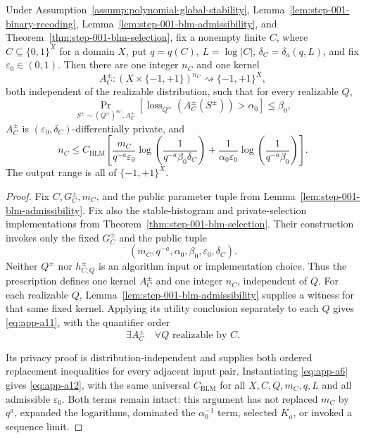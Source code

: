 \begin{proposition}
\label{prop:step-001-uniform-blm}
Under Assumption~\ref{assump:polynomial-global-stability},
Lemma~\ref{lem:step-001-binary-recoding},
Lemma~\ref{lem:step-001-blm-admissibility}, and
Theorem~\ref{thm:step-001-blm-selection}, fix a nonempty finite \(C\),
where \(C\subseteq\{0,1\}^X\) for a domain \(X\), put
\(q=q(C)\), \(L=\log|C|\),
\(\delta_C=\delta_a(q,L)\), and fix
\(\varepsilon_0\in(0,1)\).  Then there are one integer \(n_C\) and one
kernel
\[
A_C^\pm:(X\times\{-1,+1\})^{n_C}
\rightsquigarrow\{-1,+1\}^X,
\]
both independent of the realizable distribution, such that for every
realizable \(Q\),
\begin{equation}
\Pr_{S^\pm\sim(Q^\pm)^{n_C},A_C^\pm}
\!\left[
\operatorname{loss}_{Q^\pm}(A_C^\pm(S^\pm))>\alpha_0
\right]\leq\beta_0,
\label{eq:app-a11}
\end{equation}
\(A_C^\pm\) is \((\varepsilon_0,\delta_C)\)-differentially private,
and
\begin{equation}
n_C\leq C_{\mathrm{BLM}}
\left[
\frac{m_C}{q^{-a}\varepsilon_0}
\log\!\left(\frac1{q^{-a}\beta_0\delta_C}\right)
+
\frac1{\alpha_0\varepsilon_0}
\log\!\left(\frac1{q^{-a}\beta_0}\right)
\right].
\label{eq:app-a12}
\end{equation}
The output range is all of \(\{-1,+1\}^X\).
\end{proposition}

\begin{proof}
Fix \(C,G_C^\pm,m_C\), and the public parameter tuple from
Lemma~\ref{lem:step-001-blm-admissibility}.  Fix also the
stable-histogram and private-selection implementations from
Theorem~\ref{thm:step-001-blm-selection}.  Their construction invokes
only the fixed \(G_C^\pm\) and the public tuple
\[
(m_C,q^{-a},\alpha_0,\beta_0,\varepsilon_0,\delta_C).
\]
Neither \(Q^\pm\) nor \(h_{C,Q}^\pm\) is an algorithm input or
implementation choice.  Thus the prescription defines one kernel
\(A_C^\pm\) and one integer \(n_C\), independent of \(Q\).
For each realizable \(Q\),
Lemma~\ref{lem:step-001-blm-admissibility} supplies a witness for that
same fixed kernel.  Applying its utility conclusion
separately to each \(Q\) gives \eqref{eq:app-a11}, with the quantifier order
\[
\exists A_C^\pm\quad
\forall Q\text{ realizable by }C.
\]

Its privacy proof is distribution-independent and supplies
both ordered replacement inequalities for every adjacent input pair.
Instantiating \eqref{eq:app-a6} gives \eqref{eq:app-a12}, with the same universal
\(C_{\mathrm{BLM}}\) for all \(X,C,Q,m_C,q,L\) and all admissible
\(\varepsilon_0\).  Both terms remain intact: this argument has not
replaced \(m_C\) by \(q^a\), expanded the logarithms, dominated the
\(\alpha_0^{-1}\) term, selected \(K_a\), or invoked a sequence
limit.
\end{proof}

